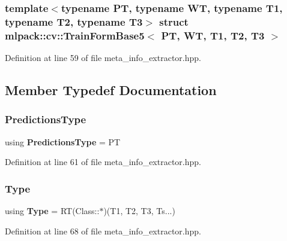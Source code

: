 \subsubsection*{template$<$typename PT, typename WT, typename T1, typename T2, typename T3$>$\newline
struct mlpack\+::cv\+::\+Train\+Form\+Base5$<$ P\+T, W\+T, T1, T2, T3 $>$}



Definition at line 59 of file meta\+\_\+info\+\_\+extractor.\+hpp.



\subsection{Member Typedef Documentation}
\mbox{\label{structmlpack_1_1cv_1_1TrainFormBase5_a329a0bee5f08ebbfbd6c97e4f74bdb4f}} 
\subsubsection{Predictions\+Type}
{\footnotesize\ttfamily using \textbf{ Predictions\+Type} =  PT}



Definition at line 61 of file meta\+\_\+info\+\_\+extractor.\+hpp.

\mbox{\label{structmlpack_1_1cv_1_1TrainFormBase5_aafe4d92b3375aba15ef2942c225e81b0}} 
\subsubsection{Type}
{\footnotesize\ttfamily using \textbf{ Type} =  RT(Class\+::$\ast$)(T1, T2, T3, Ts...)}



Definition at line 68 of file meta\+\_\+info\+\_\+extractor.\+hpp.

\mbox{\label{structmlpack_1_1cv_1_1TrainFormBase5_aecfc3bfd62796ddd9feb857c898cefa8}} 
